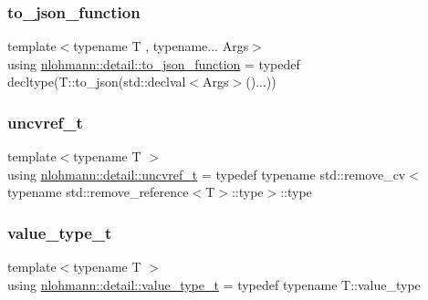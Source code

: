 \mbox{\label{namespacenlohmann_1_1detail_af846b6cf2f926009ff3a7a61495ca383}} 
\subsubsection{\texorpdfstring{to\+\_\+json\+\_\+function}{to\_json\_function}}
{\footnotesize\ttfamily template$<$typename T , typename... Args$>$ \\
using \hyperlink{namespacenlohmann_1_1detail_af846b6cf2f926009ff3a7a61495ca383}{nlohmann\+::detail\+::to\+\_\+json\+\_\+function} = typedef decltype(T\+::to\+\_\+json(std\+::declval$<$Args$>$()...))}

\mbox{\label{namespacenlohmann_1_1detail_a53a082eedad9f4729fcd8fed552a21f7}} 
\subsubsection{\texorpdfstring{uncvref\+\_\+t}{uncvref\_t}}
{\footnotesize\ttfamily template$<$typename T $>$ \\
using \hyperlink{namespacenlohmann_1_1detail_a53a082eedad9f4729fcd8fed552a21f7}{nlohmann\+::detail\+::uncvref\+\_\+t} = typedef typename std\+::remove\+\_\+cv$<$typename std\+::remove\+\_\+reference$<$T$>$\+::type$>$\+::type}

\mbox{\label{namespacenlohmann_1_1detail_af91beae90c2fb0f931079b3d50a343bc}} 
\subsubsection{\texorpdfstring{value\+\_\+type\+\_\+t}{value\_type\_t}}
{\footnotesize\ttfamily template$<$typename T $>$ \\
using \hyperlink{namespacenlohmann_1_1detail_af91beae90c2fb0f931079b3d50a343bc}{nlohmann\+::detail\+::value\+\_\+type\+\_\+t} = typedef typename T\+::value\+\_\+type}


